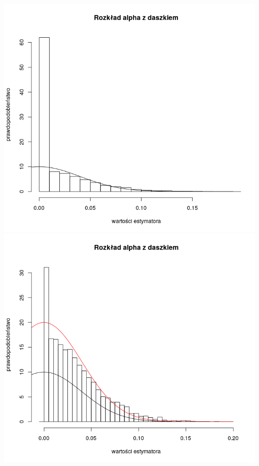 \documentclass[a4paper,11pt]{article}
\begin{document}
\includegraphics[scale=.3]{Rplot10.png} 
\includegraphics[scale=.3]{Rplot11.png} 
\end{document}
